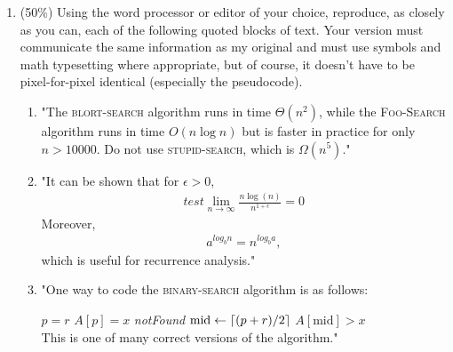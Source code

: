 \documentclass[11pt]{article}
\newcommand{\ceil}[1]{\ensuremath \left\lceil #1 \right\rceil}
\begin{document}
\begin{enumerate}
\item (50\%) Using the word processor or editor of your choice, reproduce, as closely as you can, each of the
following quoted blocks of text. Your version must communicate the same information as my original
and must use symbols and math typesetting where appropriate, but of course, it doesn’t have to be
pixel-for-pixel identical (especially the pseudocode).
\begin{enumerate} 
\item "The \textsc{blort-search} algorithm runs in time $\Theta(n^2)$, while the \textsc{Foo-Search} algorithm runs in time $O(n\log n)$ but is faster in practice for only $n > 10000$.  Do not use \textsc{stupid-search}, which is $\Omega(n^5)$."
\item
"It can be shown that for $\epsilon>0$,
\begin{align*}test
\lim_{n\to\infty}\frac{n\log (n)}{n^{1+\epsilon}}=0
\end{align*}
Moreover,
\begin{align*}
a^{log_b n}=n^{log_b a},
\end{align*}
which is useful for recurrence analysis."
\item "One way to code the \textsc{binary-search} algorithm is as follows:
\begin{algorithmic}
 \If $p=r$
 	\If $A[p]=x$
 		\State {}
 	\Else
 		\State \Return \textit{notFound}
 	\EndIf
 \Else 
 	\State $\textrm{mid} \gets \ceil{(p+r)/2} $
 	\If $A[\textrm{mid}] > x$
 		\State \Return {}
 	\Else
 		\State \Return {}
 	\EndIf
 \EndIf
\EndProcedure
\\
This is one of many correct versions of the algorithm."
\end{algorithmic}
\end{enumerate}
\end{enumerate}
\end{document}
